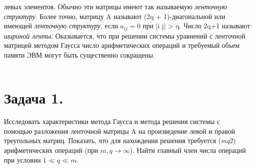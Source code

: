 \documentclass[a4paper, twoside, 12pt]{article}
\begin{document}
\noindent  левых элементов. Обычно эти матрицы имеют так называемую \textit{ленточную структуру}. Более точно, матрицу A называют (2q + 1)-диагональной или имеющей \textit{ленточную структуру}, если $a_{i j} = 0$ при |i \text{-} j| > q.
Число 2q+1 называют \textit{шириной ленты}. Оказывается, что при решении системы уравнений с ленточной матрицей методом Гаусса число арифметических операций и требуемый объем памяти ЭВМ могут быть существенно сокращены.
\\ \\ 
\chapter{\textbf{Задача 1.}} Исследовать характеристики метода Гаусса и метода решения системы с помощью разложения ленточной матрицы A на произведение левой и правой треугольных матриц. Показать, что для нахождения решения требуется (\textit{mq}2) арифметических операций (при $m, q \to \infty$). Найти главный член числа операций при условии $1 \ll q \ll m$.
\\ \\ 
\end{document}
